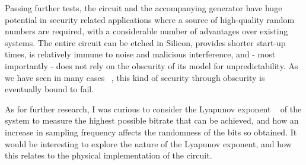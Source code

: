 \documentclass[jou,apacite]{apa6}
\begin{document}
Passing further tests, the circuit and the accompanying generator have huge potential in security related applications where a source of high-quality random numbers are required, with a considerable number of advantages over existing systems. The entire circuit can be etched in Silicon, provides shorter start-up times, is relatively immune to noise and malicious interference, and - most importantly - does not rely on the obscurity of its model for unpredictability. As we have seen in many cases ~\cite{knuth}, this kind of security through obscurity is eventually bound to fail.

As for further research, I was curious to consider the Lyapunov exponent ~\cite{lyap} of the system to measure the highest possible bitrate that can be achieved, and how an increase in sampling frequency affects the randomness of the bits so obtained. It would be interesting to explore the nature of the Lyapunov exponent, and how this relates to the physical implementation of the circuit.


\end{document}
